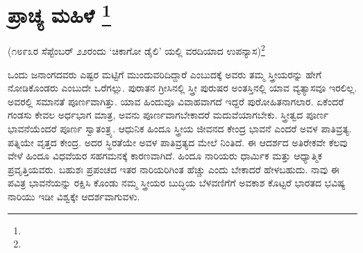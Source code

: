 
\chapter[ಪ್ರಾಚ್ಯ ಮಹಿಳೆ ]{ಪ್ರಾಚ್ಯ ಮಹಿಳೆ \protect\footnote{}}

\centerline{(೧೮೯೩ರ ಸೆಪ್ಟೆಂಬರ್​ ೨೨ರಂದು ‘ಚಿಕಾಗೋ ಡೈಲಿ’ ಯಲ್ಲಿ ವರದಿಯಾದ ಉಪನ್ಯಾಸ)\footnote{}}

ಒಂದು ಜನಾಂಗದವರು ಎಷ್ಟರ ಮಟ್ಟಿಗೆ ಮುಂದುವರಿದಿದ್ದಾರೆ ಎಂಬುದಕ್ಕೆ ಅವರು ತಮ್ಮ ಸ್ತ್ರೀಯರನ್ನು ಹೇಗೆ ನೋಡಿಕೊಂಡರು ಎಂಬುದೇ ಒರೆಗಲ್ಲು. ಪುರಾತನ ಗ್ರೀಸಿನಲ್ಲಿ ಸ್ತ್ರೀ ಪುರುಷರ ಅಂತಸ್ತಿನಲ್ಲಿ ಯಾವ ವ್ಯತ್ಯಾಸವೂ ಇರಲಿಲ್ಲ. ಅವರಲ್ಲಿ ಸಮಾನತೆ ಪೂರ್ಣವಾಗಿತ್ತು. ಯಾವ ಹಿಂದುವೂ ವಿವಾಹವಾಗದೆ ಇದ್ದರೆ ಪುರೋಹಿತನಾಗಲಾರ. ಏಕೆಂದರೆ ಗಂಡಸು ಕೇವಲ ಅರ್ಧಭಾಗ ಮಾತ್ರ, ಅವನು ಪೂರ್ಣವಾಗಬೇಕಾದರೆ ಮದುವೆಯಾಗಬೇಕು. ಸ್ತ್ರೀತ್ವದ ಪೂರ್ಣ ಭಾವನೆಯೆಂದರೆ ಪೂರ್ಣ ಸ್ವಾತಂತ್ರ್ಯ. ಆಧುನಿಕ ಹಿಂದೂ ಸ್ತ್ರೀಯ ಜೀವನದ ಕೇಂದ್ರ ಭಾವನೆ ಎಂದರೆ ಅವಳ ಪಾತಿವ್ರತ್ಯ. ಪತ್ನಿಯೇ ವೃತ್ತದ ಕೇಂದ್ರ. ಅದರ ಸ್ಥಿರತೆಯೇ ಅವಳ ಪಾತಿವ್ರತ್ಯದ ಮೇಲೆ ನಿಂತಿದೆ. ಈ ಆದರ್ಶದ ಅತಿರೇಕವೇ ಕೆಲವು ವೇಳೆ ಹಿಂದೂ ವಿಧವೆಯರ ಸಹಗಮನಕ್ಕೆ ಕಾರಣವಾಗಿದೆ. ಹಿಂದೂ ನಾರಿಯರು ಧಾರ್ಮಿಕ ಮತ್ತು ಆಧ್ಯಾತ್ಮಿಕ ಪ್ರವೃತ್ತಿಯವರು. ಬಹುಶಃ ಪ್ರಪಂಚದ ಇತರ ನಾರಿಯರಿಗಿಂತ ಹೆಚ್ಚು ಎಂದು ಬೇಕಾದರೆ ಹೇಳಬಹುದು. ನಾವು ಈ ಪವಿತ್ರ ಭಾವನೆಯನ್ನು ರಕ್ಷಿಸಿ ಕೊಂಡು ನಮ್ಮ ಸ್ತ್ರೀಯರ ಬುದ್ಧಿಯ ಬೆಳವಣಿಗೆಗೆ ಅವಕಾಶ ಕೊಟ್ಟರೆ ಭಾರತದ ಭವಿಷ್ಯ ನಾರಿಯು ಇಡೀ ವಿಶ್ವಕ್ಕೇ ಆದರ್ಶವಾಗುವಳು.


